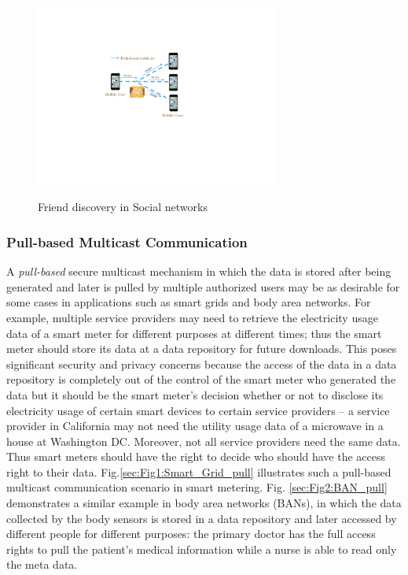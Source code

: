 \documentclass[letterpaper,12pt]{article}
\begin{document}
\begin{figure}[!htp]
\centering
 \includegraphics[width=8cm]{Social_network}\\
 \centering \caption{Friend discovery in Social networks}\label{sec:Fig2:Social_network}
\end{figure}




\subsubsection{Pull-based Multicast Communication}\label{sec:pull}
 A \emph{pull-based} secure multicast mechanism in which the data is stored after being generated and later is pulled by multiple authorized users may be as desirable for some cases in applications such as smart grids and body area networks. For example, multiple service providers may need to retrieve the electricity usage data of a smart meter for different purposes at different times; thus the smart meter should store its data at a data repository for future downloads. This poses significant security and privacy concerns because the access of the data in a data repository is completely out of the control of the smart meter who generated the data but it should be the smart meter's decision whether or not to disclose its electricity usage of certain smart devices to certain service providers -- a service provider in California may not need the utility usage data of a microwave in a house at Washington DC. Moreover, not all service providers need the same data. Thus smart meters should have the right to decide who should have the access right to their data. Fig.\ref{sec:Fig1:Smart_Grid_pull} illustrates such a pull-based multicast communication scenario in smart metering. Fig. \ref{sec:Fig2:BAN_pull} demonstrates a similar example in body area networks (BANs), in which the data collected by the body sensors is stored in a data repository and later accessed by different people for different purposes: the primary doctor has the full access rights to pull the patient's medical information while a nurse is able to read only the meta data.
\end{document}

